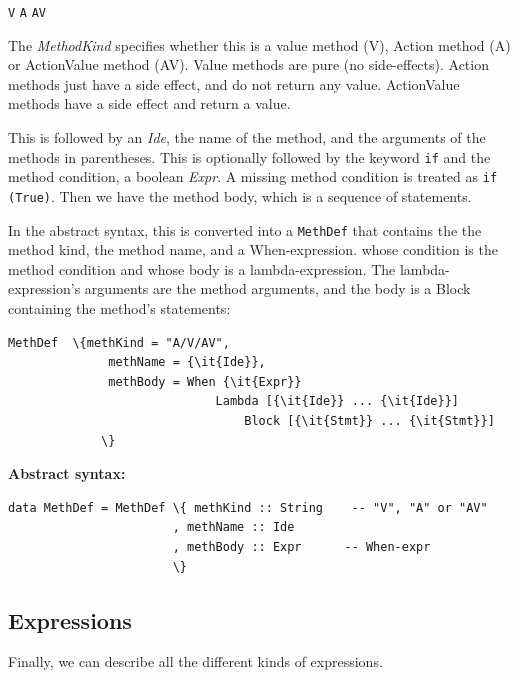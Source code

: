 \documentclass[11pt]{article}
\newcommand{\hm}{\hspace*{1em}}
\newcommand{\nterm}[1]{\emph{#1}}
\newcommand{\term}[1]{\texttt{#1}}
\newcommand{\alt}{{$\mid$}}
\newcommand{\gram}[2]{    \hm\makebox[10em][l]{\it #1}\makebox[1.5em][l]{::=}    #2}
\begin{document}
\gram{MethodKind}{\term{V} \hm \alt \hm \term{A} \hm \alt \hm \term{AV}}

The \nterm{MethodKind} specifies whether this is a value method (V),
Action method (A) or ActionValue method (AV).  Value methods are pure
(no side-effects). Action methods just have a side effect, and do not
return any value. ActionValue methods have a side effect and return a
value.

This is followed by an \nterm{Ide}, the name of the method, and the
arguments of the methods in parentheses. This is optionally followed
by the keyword \term{if} and the method condition, a boolean
\nterm{Expr}. A missing method condition is treated as \verb|if (True)|.
Then we have the method body, which is a sequence of
statements.

In the abstract syntax, this is converted into a \term{MethDef} that
contains the the method kind, the method name, and a When-expression.
whose condition is the method condition and whose body is a
lambda-expression.  The lambda-expression's arguments are the method
arguments, and the body is a Block containing the method's statements:

\begin{Verbatim}[frame=single, commandchars=\\\{\}]
    MethDef  \{methKind = "A/V/AV",
              methName = {\it{Ide}},
              methBody = When {\it{Expr}}
                             Lambda [{\it{Ide}} ... {\it{Ide}}]
                                 Block [{\it{Stmt}} ... {\it{Stmt}}]
             \}
\end{Verbatim}


{\bf Abstract syntax:}

\begin{Verbatim}[frame=single, commandchars=\\\{\}]
data MethDef = MethDef \{ methKind :: String    -- "V", "A" or "AV"
                       , methName :: Ide
                       , methBody :: Expr      -- When-expr
                       \}
\end{Verbatim}


\subsection{Expressions}

\label{sec_syntax_expr}

Finally, we can describe all the different kinds of expressions.
\end{document}
